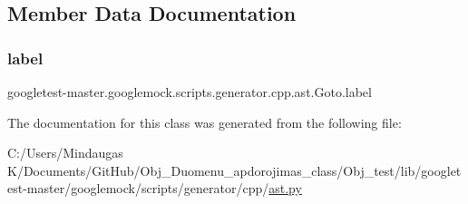 \subsection{Member Data Documentation}
\mbox{\label{classgoogletest-master_1_1googlemock_1_1scripts_1_1generator_1_1cpp_1_1ast_1_1_goto_a013c7dc9fce090db96490847ffdabe17}} 
\subsubsection{\texorpdfstring{label}{label}}
{\footnotesize\ttfamily googletest-\/master.\+googlemock.\+scripts.\+generator.\+cpp.\+ast.\+Goto.\+label}



The documentation for this class was generated from the following file\+:\begin{DoxyCompactItemize}
\item 
C\+:/\+Users/\+Mindaugas K/\+Documents/\+Git\+Hub/\+Obj\+\_\+\+Duomenu\+\_\+apdorojimas\+\_\+class/\+Obj\+\_\+test/lib/googletest-\/master/googlemock/scripts/generator/cpp/\mbox{\hyperlink{_obj__test_2lib_2googletest-master_2googlemock_2scripts_2generator_2cpp_2ast_8py}{ast.\+py}}\end{DoxyCompactItemize}
